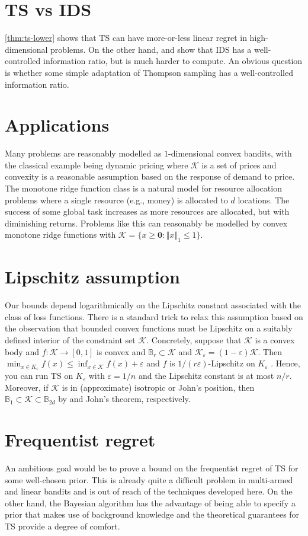 \documentclass[letter, 12pt]{report}
\newcommand{\ball}{\mathbb{B}}
\newcommand{\norm}[1]{\left \Vert  #1 \right \Vert}
\newcommand{\cK}{\mathcal K}
\newcommand{\zeros}{ \bm 0}
\newcommand{\1}{\mathbf{1}}
\newcommand{\ts}{\textsc{TS}\xspace}
\newcommand{\IDS}{\textsc{IDS}}
\renewcommand{\epsilon}{\varepsilon}
\theoremstyle{plain}
\theoremstyle{definition}
\theoremstyle{remark}
\begin{document}
\section{\ts{} vs \IDS} \cref{thm:ts-lower} shows that \ts{} can have more-or-less linear regret in high-dimensional problems. On the other hand,
\cite{BE18} and \cite{Lat20-cvx} show that \IDS{} has a well-controlled information ratio, but is much harder to compute.
An obvious question is whether some simple adaptation of Thompson sampling has a well-controlled information ratio.
\section{Applications} Many problems are reasonably modelled as $1$-dimensional convex bandits, with the classical example being dynamic pricing
where $\cK$ is a set of prices and convexity is a reasonable assumption based on the response of demand to price.
The monotone ridge function class is a natural model for resource allocation problems where a single resource (e.g., money) is allocated to $d$ locations.
The success of some global task increases as more resources are allocated, but with diminishing returns. Problems like this can reasonably be modelled
by convex monotone ridge functions with $\cK = \{x \geq \zeros : \norm{x}_1 \leq 1\}$.
\section{Lipschitz assumption} Our bounds depend logarithmically on the Lipschitz constant associated with the class of loss functions.
There is a standard trick to relax this assumption based on the observation that bounded convex functions must be Lipschitz on a suitably defined
interior of the constraint set $\cK$.
Concretely, suppose that $\cK$ is a convex body and $f : \cK \to [0,1]$ is convex and $\ball_r \subset \cK$ and $\cK_\epsilon = (1 - \epsilon) \cK$.
Then $\min_{x \in K_\epsilon} f(x) \leq \inf_{x \in \cK} f(x) + \epsilon$ and $f$ is $1/(r\epsilon)$-Lipschitz on $K_\epsilon$ \citep[Chapter 3]{lat24book}.
Hence, you can run \ts{} on $K_\epsilon$ with $\epsilon = 1/n$ and the Lipschitz constant is at most $n/r$.
Moreover, if $\cK$ is in (approximate) isotropic or John's position, then $\ball_1 \subset \cK \subset \ball_{2d}$ by \cite{kannan1995isoperimetric}
and John's theorem, respectively.

\section{Frequentist regret}
An ambitious goal would be to prove a bound on the frequentist regret of \ts{} for some well-chosen prior.
This is already quite a difficult problem in multi-armed \citep{KKM12,AG12b} and linear bandits \citep{AG13} and is out of reach of the techniques developed here.
On the other hand, the Bayesian algorithm has the advantage of being able to specify a prior that makes use of background knowledge and the theoretical guarantees
for \ts{} provide a degree of comfort.
\end{document}
